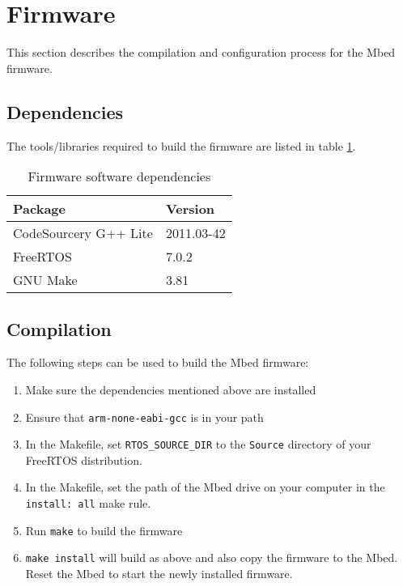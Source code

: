 	\section{Firmware}
		
		This section describes the compilation and configuration process for the
		Mbed firmware.
		
		\subsection{Dependencies}
			
			The tools/libraries required to build the firmware are listed in table
			\ref{tab:dependencies}.
			
			\begin{table}
				\centering
				\begin{tabular}{l l}
					\toprule
					Package & Version \\
					\midrule
					CodeSourcery G++ Lite & 2011.03-42 \\
					FreeRTOS & 7.0.2 \\
					GNU Make & 3.81 \\
					\bottomrule
				\end{tabular}
				
				\caption{Firmware software dependencies}
				\label{tab:dependencies}
			\end{table}
			
		\subsection{Compilation}
			
			\label{sec:compilation}
			
			The following steps can be used to build the Mbed firmware:
			
			\begin{enumerate}
				
				\item Make sure the dependencies mentioned above are installed
				
				\item Ensure that \verb|arm-none-eabi-gcc| is in your path
				
				\item In the Makefile, set \verb|RTOS_SOURCE_DIR| to the \verb|Source|
				directory of your FreeRTOS distribution.
				
				\item In the Makefile, set the path of the Mbed drive on your computer
				in the \verb|install: all| make rule.
				
				\item Run \verb|make| to build the firmware
				
				\item \verb|make install| will build as above and also copy the firmware
				to the Mbed. Reset the Mbed to start the newly installed firmware.
				
			\end{enumerate}
		
